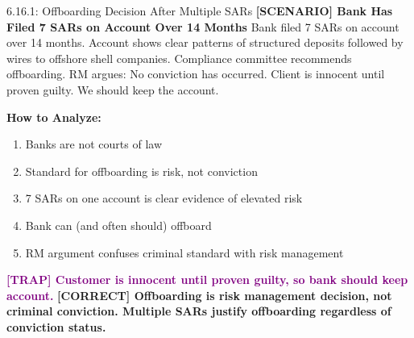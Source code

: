 \documentclass[11pt,a4paper]{beamer}
\newcommand{\trap}[1]{\textcolor{purple}{\textbf{[TRAP] #1}}}
\newcommand{\correct}[1]{\textcolor{green!50!black}{\textbf{[CORRECT] #1}}}
\newcommand{\scenario}[1]{\textcolor{blue!70!black}{\textbf{[SCENARIO] #1}}}
\begin{document}
\begin{frame}{6.16.1: Offboarding Decision After Multiple SARs}
	\scenario{Bank Has Filed 7 SARs on Account Over 14 Months}
	Bank filed 7 SARs on account over 14 months. Account shows clear patterns of structured deposits followed by wires to offshore shell companies. Compliance committee recommends offboarding. RM argues: No conviction has occurred. Client is innocent until proven guilty. We should keep the account.
	
	\vspace{0.1cm}
	\textbf{How to Analyze:}
	\begin{enumerate}
		\item Banks are not courts of law
		\item Standard for offboarding is risk, not conviction
		\item 7 SARs on one account is clear evidence of elevated risk
		\item Bank can (and often should) offboard
		\item RM argument confuses criminal standard with risk management
	\end{enumerate}
	\trap{Customer is innocent until proven guilty, so bank should keep account.}
	\correct{Offboarding is risk management decision, not criminal conviction. Multiple SARs justify offboarding regardless of conviction status.}
\end{frame}
\end{document}
